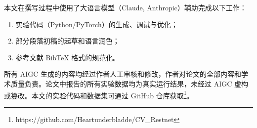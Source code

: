 \documentclass[12pt,a4paper]{ctexart}
\begin{document}
本文在撰写过程中使用了大语言模型（Claude, Anthropic）辅助完成以下工作：
\begin{enumerate}[noitemsep]
    \item 实验代码（Python/PyTorch）的生成、调试与优化；
    \item 部分段落初稿的起草和语言润色；
    \item 参考文献 BibTeX 格式的规范化。
\end{enumerate}

所有 AIGC 生成的内容均经过作者人工审核和修改，作者对论文的全部内容和学术质量负责。论文中报告的所有实验数据均为真实运行结果，未经过 AIGC 虚构或篡改。本文的实验代码和数据集可通过 GitHub 仓库获取\footnote{https://github.com/Heartunderbladde/CV\_Restnet}。
\end{document}
